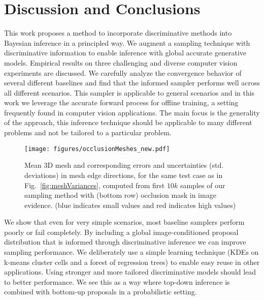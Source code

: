 \section{Discussion and Conclusions}
\label{sec:discussion-chap3}
This work proposes a method to incorporate discriminative methods into
Bayesian inference in a principled way. We augment a sampling
technique with discriminative information to enable inference with
global accurate generative models. Empirical results on three
challenging and diverse computer vision experiments are discussed. We
carefully analyze the convergence behavior of several different
baselines and find that the informed sampler performs well across all
different scenarios. This sampler is applicable to general scenarios
and in this work we leverage the accurate forward process for offline
training, a setting frequently found in computer vision applications.
The main focus is the generality of the approach, this inference
technique should be applicable to many different problems and not be
tailored to a particular problem.

\begin{figure}[!t]
\begin{center}
\centerline{\texttt{[image: figures/occlusionMeshes\_new.pdf]}}
  {Mean 3D mesh and corresponding errors and uncertainties
  (std. deviations) in mesh edge directions, for the same test case as in Fig.~\ref{fig:meshVariances},
  computed from first $10k$ samples of our \MIXLMH sampling method
  with (bottom row) occlusion mask in image evidence.
(blue indicates small values and red indicates high values)}
\label{fig:occlusionMeshes}
\end{center}
\end{figure}

We show that even for very simple scenarios, most baseline samplers
perform poorly or fail completely. By including a global
image-conditioned proposal distribution that is informed through
discriminative inference we can improve sampling performance. We
deliberately use a simple learning technique (KDEs on k-means cluster
cells and a forest of regression trees) to enable easy reuse in other
applications. Using stronger and more tailored discriminative models
should lead to better performance. We see this as a way where top-down
inference is combined with bottom-up proposals in a probabilistic
setting.

